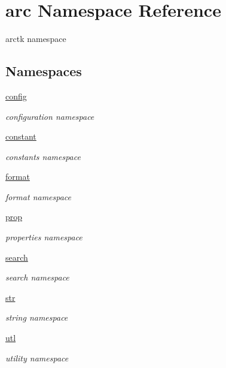 \hypertarget{namespacearc}{}\section{arc Namespace Reference}
\label{namespacearc}


arctk namespace  


\subsection*{Namespaces}
\begin{DoxyCompactItemize}
\item 
 \mbox{\hyperlink{namespacearc_1_1config}{config}}
\begin{DoxyCompactList}\small\item\em configuration namespace \end{DoxyCompactList}\item 
 \mbox{\hyperlink{namespacearc_1_1constant}{constant}}
\begin{DoxyCompactList}\small\item\em constants namespace \end{DoxyCompactList}\item 
 \mbox{\hyperlink{namespacearc_1_1format}{format}}
\begin{DoxyCompactList}\small\item\em format namespace \end{DoxyCompactList}\item 
 \mbox{\hyperlink{namespacearc_1_1prop}{prop}}
\begin{DoxyCompactList}\small\item\em properties namespace \end{DoxyCompactList}\item 
 \mbox{\hyperlink{namespacearc_1_1search}{search}}
\begin{DoxyCompactList}\small\item\em search namespace \end{DoxyCompactList}\item 
 \mbox{\hyperlink{namespacearc_1_1str}{str}}
\begin{DoxyCompactList}\small\item\em string namespace \end{DoxyCompactList}\item 
 \mbox{\hyperlink{namespacearc_1_1utl}{utl}}
\begin{DoxyCompactList}\small\item\em utility namespace \end{DoxyCompactList}\end{DoxyCompactItemize}
